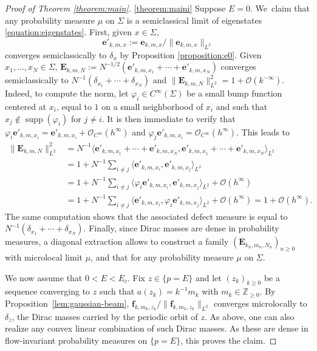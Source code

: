 \documentclass[10pt]{amsart}
\newcommand{\bE}{\boldsymbol{E}}
\newcommand{\bme}{\boldsymbol{e}}
\newcommand{\bmf}{\boldsymbol{f}}
\theoremstyle{plain}
\theoremstyle{definition}
\let\mc\mathcal
\newcommand{\Z}{\mathbb{Z}}
\DeclareMathOperator{\supp}{supp}
\begin{document}
\skpt
\begin{proof}[Proof of Theorem \ref{theorem:main}]

\eqref{theorem:maini}
Suppose $E=0$. We~claim that any probability measure $\mu$ on $\Sigma$ is a semiclassical limit of eigenstates \eqref{equation:eigenstates}. First, given $x \in \Sigma$,
\[
\bme'_{k,m,x} := \bme_{k,m,x}/\|\bme_{k,m,x}\|_{L^2}
\]
converges semiclassically to $\delta_x$ by Proposition \ref{proposition:e0}. Given $x_1,\dots, x_N \in \Sigma$, $\bE_{k,m,N} := N^{-1/2}(\bme'_{k,m,x_1} +\cdots+ \bme'_{k,m,x_N})$ converges semiclassically to $N^{-1}(\delta_{x_1}+\cdots+\delta_{x_N})$ and $\|\bE_{k,m,N}\|^2_{L^2} = 1 + \mc{O}(k^{-\infty})$. Indeed, to compute the norm, let $\varphi_{i} \in C^\infty(\Sigma)$ be a small bump function centered at $x_i$, equal to $1$ on a small neighborhood of $x_i$ and such that $x_j \notin \supp(\varphi_i)$ for $j \neq i$. It is then immediate to verify that $\varphi_i \bme'_{k,m,x_i} = \bme'_{k,m,x_i} + \mc{O}_{C^\infty}(h^\infty)$ and $\varphi_j \bme'_{k,m,x_i} = \mc{O}_{C^\infty}(h^\infty)$. This leads to
\[
\begin{split}
\|\bE_{k,m,N}\|^2_{L^2} & = N^{-1}\langle \bme'_{k,m,x_1} +\cdots+ \bme'_{k,m,x_N}, \bme'_{k,m,x_1} +\cdots+ \bme'_{k,m,x_N}\rangle_{L^2} \\
& = 1 + N^{-1} \sum_{i \neq j} \langle \bme'_{k,m,x_i},\bme'_{k,m,x_j}\rangle_{L^2} \\
& = 1 + N^{-1} \sum_{i \neq j} \langle \varphi_i \bme'_{k,m,x_i},\bme'_{k,m,x_j}\rangle_{L^2} + \mc{O}(h^\infty) \\
& = 1 + N^{-1} \sum_{i \neq j} \langle \bme'_{k,m,x_i},\varphi_i \bme'_{k,m,x_j}\rangle_{L^2} + \mc{O}(h^\infty) = 1 + \mc{O}(h^\infty).
\end{split}
\]
The same computation shows that the associated defect measure is equal to \hbox{$N^{-1}(\delta_{x_1}+\cdots+\delta_{x_N})$}. Finally, since Dirac masses are dense in probability measures, a diagonal extraction allows to construct a family $(\bE_{k_n,m_n,N_n})_{n \geq 0}$ with microlocal limit $\mu$, and that for any probability measure $\mu$ on $\Sigma$.

We now assume that $0 < E < E_c$. Fix $z \in \{p=E\}$ and let $(z_k)_{k \geq 0}$ be a sequence converging to $z$ such that $a(z_k) = k^{-1}m_k$ with $m_k \in \Z_{\geq 0}$. By Proposition~\ref{lem:gaussian-beam}, $\bmf_{k,m_k,z_k}/\|\bmf_{k,m_k,z_k}\|_{L^2}$ converges microlocally to $\delta_z$, the Dirac masses carried by the periodic orbit of $z$. As above, one can also realize any convex linear combination of such Dirac masses. As these are dense in flow-invariant probability measures on $\{p=E\}$, this proves the claim.


\end{proof}
\end{document}
